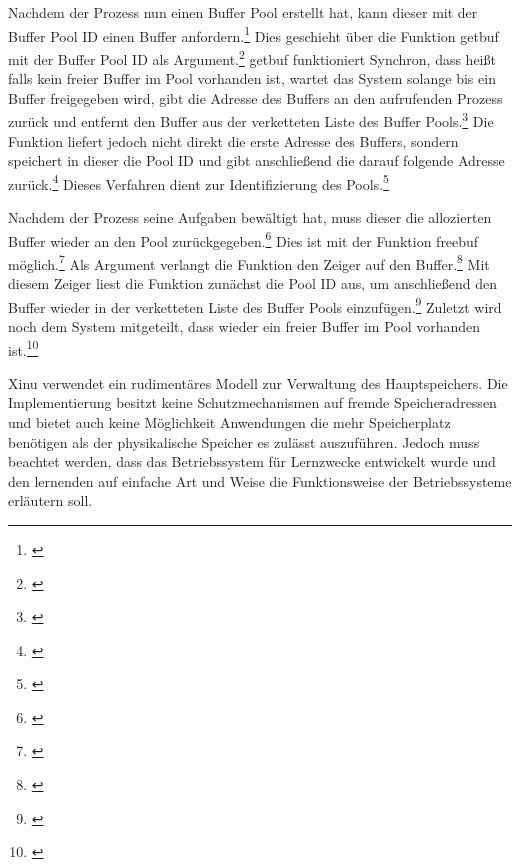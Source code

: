 

Nachdem der Prozess nun einen Buffer Pool erstellt hat, kann dieser mit der Buffer Pool ID einen Buffer anfordern.\footnote{\cite[S.~178]{Comer.2015}} Dies geschieht über die Funktion getbuf mit der Buffer Pool ID als Argument.\footnote{\cite[S.~178]{Comer.2015}} getbuf funktioniert Synchron, dass heißt falls kein freier Buffer im Pool vorhanden ist, wartet das System solange bis ein Buffer freigegeben wird, gibt die Adresse des Buffers an den aufrufenden Prozess zurück und entfernt den Buffer aus der verketteten Liste des Buffer Pools.\footnote{\cite[S.~178]{Comer.2015}}  Die Funktion liefert jedoch nicht direkt die erste Adresse des Buffers, sondern speichert in dieser die Pool ID und gibt anschließend die darauf folgende Adresse zurück.\footnote{\cite[S.~179]{Comer.2015}} Dieses Verfahren dient zur Identifizierung des Pools.\footnote{\cite[S.~179]{Comer.2015}}



Nachdem der Prozess seine Aufgaben bewältigt hat, muss dieser die allozierten Buffer wieder an den Pool zurückgegeben.\footnote{\cite[S.~179]{Comer.2015}} Dies ist mit der Funktion freebuf möglich.\footnote{\cite[S.~179]{Comer.2015}} Als Argument verlangt die Funktion den Zeiger auf den Buffer.\footnote{\cite[S.~179]{Comer.2015}} Mit diesem Zeiger liest die Funktion zunächst die Pool ID aus, um anschließend den Buffer wieder in der verketteten Liste des Buffer Pools einzufügen.\footnote{\cite[S.~180]{Comer.2015}} Zuletzt wird noch dem System mitgeteilt, dass wieder ein freier Buffer im Pool vorhanden ist.\footnote{\cite[S.~180]{Comer.2015}}



Xinu verwendet ein rudimentäres Modell zur Verwaltung des Hauptspeichers. Die Implementierung besitzt keine Schutzmechanismen auf fremde Speicheradressen und bietet auch keine Möglichkeit Anwendungen die mehr Speicherplatz benötigen als der physikalische Speicher es zulässt auszuführen. Jedoch muss beachtet werden, dass das Betriebssystem für Lernzwecke entwickelt wurde und den lernenden auf einfache Art und Weise die Funktionsweise der Betriebssysteme erläutern soll.

